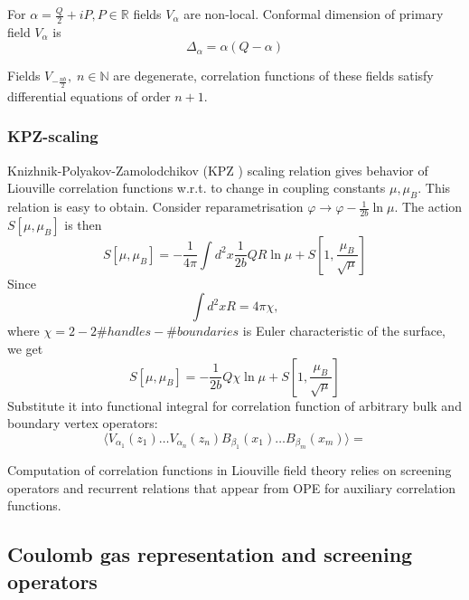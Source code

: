 \documentclass[12pt]{article}
\begin{document}
For $\alpha=\frac{Q}{2}+i P, P\in \mathbb{R}$
fields $V_{\alpha}$ are non-local. Conformal dimension of primary field $V_{\alpha}$ is
\begin{equation}
  \label{eq:32}
  \Delta_{\alpha}=\alpha(Q-\alpha)
\end{equation}

Fields $V_{-\frac{nb}{2}}, \; n\in \mathbb{N}$ are degenerate, correlation functions of these fields
satisfy differential equations of order $n+1$. 

\subsubsection{KPZ-scaling}
\label{sec:kpz-scaling}

Knizhnik-Polyakov-Zamolodchikov (KPZ \cite{knizhnik1988fractal}) scaling relation gives behavior of
Liouville correlation functions w.r.t. to change in coupling constants $\mu, \mu_{B}$. This relation
is easy to obtain. Consider reparametrisation $\varphi\to\varphi-\frac{1}{2b}\ln\mu$. The action
$S[\mu,\mu_{B}]$ is then
\begin{equation}
  \label{eq:84}
  S[\mu,\mu_{B}]=-\frac{1}{4\pi}\int d^{2}x \frac{1}{2b}QR\ln\mu+S\left[1,\frac{\mu_{B}}{\sqrt{\mu}}\right]
\end{equation}
Since
\begin{equation}
  \label{eq:85}
  \int d^{2}x R =4\pi\chi,
\end{equation}
where $\chi=2-2\#handles-\#boundaries$ is Euler characteristic of the surface, we get
\begin{equation}
  \label{eq:99}
    S[\mu,\mu_{B}]=-\frac{1}{2b}Q\chi\ln\mu+S\left[1,\frac{\mu_{B}}{\sqrt{\mu}}\right]
\end{equation}
Substitute it into functional integral for correlation function of arbitrary bulk and boundary
vertex operators:
\begin{equation}
  \label{eq:100}
  \langle V_{\alpha_{1}}(z_{1})\dots V_{\alpha_{n}}(z_{n}) B_{\beta_{1}}(x_{1})\dots B_{\beta_{m}}(x_{m})\rangle=
\end{equation}


Computation of correlation functions in Liouville field theory relies on screening operators and
recurrent relations that appear from OPE for auxiliary correlation functions.
\subsection{Coulomb gas representation and screening operators}
\label{sec:coul-gas-repr}
\end{document}
